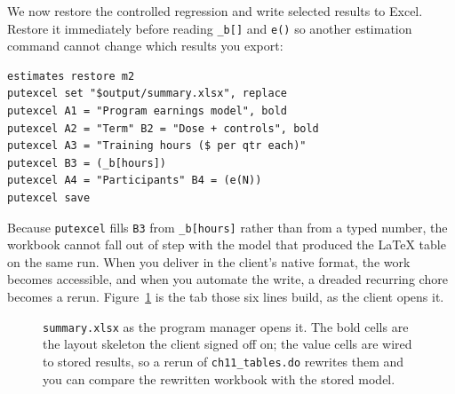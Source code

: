 \documentclass[
    a4paper,
    fontsize=10pt,
    twoside=true,
    numbers=noenddot,
]{kaobook}
\begin{document}
We now restore the controlled regression and write selected results to Excel. Restore it immediately before reading \texttt{\_b[]} and \texttt{e()} so another estimation command cannot change which results you export:
\par
{\footnotesize
\begin{verbatim}
estimates restore m2
putexcel set "$output/summary.xlsx", replace
putexcel A1 = "Program earnings model", bold
putexcel A2 = "Term" B2 = "Dose + controls", bold
putexcel A3 = "Training hours ($ per qtr each)"
putexcel B3 = (_b[hours])
putexcel A4 = "Participants" B4 = (e(N))
putexcel save
\end{verbatim}
}
Because \texttt{putexcel} fills \texttt{B3} from \texttt{\_b[hours]} rather than from a typed number, the workbook cannot fall out of step with the model that produced the \LaTeX{} table on the same run. When you deliver in the client's native format, the work becomes accessible, and when you automate the write, a dreaded recurring chore becomes a rerun. Figure~\ref{fig:ch11-viz-workbook} is the tab those six lines build, as the client opens it.

\begin{figure}[htbp]
\centering
{}
\caption[The generated summary tab]{\texttt{summary.xlsx} as the program manager opens it. The bold cells are the layout skeleton the client signed off on; the value cells are wired to stored results, so a rerun of \texttt{ch11\_tables.do} rewrites them and you can compare the rewritten workbook with the stored model.}
\label{fig:ch11-viz-workbook}
\end{figure}
\end{document}
